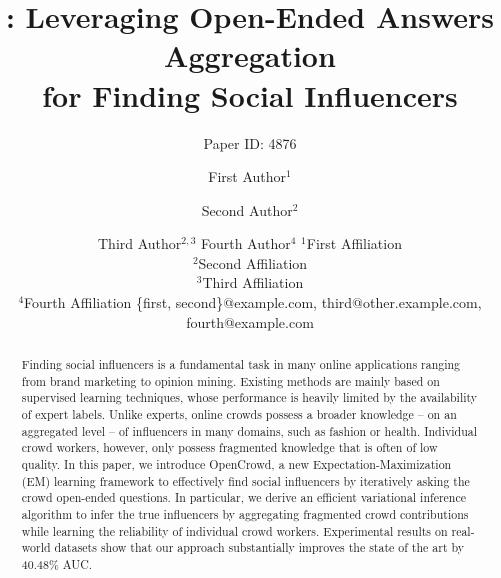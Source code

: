 \documentclass{article}
\title{\sys: Leveraging Open-Ended Answers Aggregation \\ for Finding Social Influencers}
\author{
Paper ID: 4876
}
\author{
First Author$^1$
\and
Second Author$^2$\and
Third Author$^{2,3}$\And
Fourth Author$^4$
\affiliations
$^1$First Affiliation\\
$^2$Second Affiliation\\
$^3$Third Affiliation\\
$^4$Fourth Affiliation
\emails
\{first, second\}@example.com,
third@other.example.com,
fourth@example.com
}
\newcommand{\sys}{OpenCrowd\xspace}
\begin{document}
\maketitle

\begin{abstract}
Finding social influencers is a fundamental task in many online applications ranging from brand marketing to opinion mining. Existing methods are mainly based on supervised learning techniques, whose performance is heavily limited by the availability of expert labels. Unlike experts, online crowds possess a  broader knowledge -- on an aggregated level -- of influencers in many domains, such as fashion or health. Individual crowd workers, however, only possess fragmented knowledge that is often of low quality. In this paper, we introduce \sys, a new Expectation-Maximization (EM) learning framework to effectively find social influencers by iteratively asking the crowd open-ended questions. In particular, we derive an efficient variational inference algorithm to infer the true influencers by aggregating fragmented crowd contributions while learning the reliability of individual crowd workers. Experimental results on real-world datasets show that our approach substantially improves the state of the art by  40.48\% AUC.
\end{abstract}





\label{sec:intro}


\label{sec:problem}


\label{sec:method}


\label{sec:result}


\label{sec:related}


\label{sec:conclusion}









\end{document}

